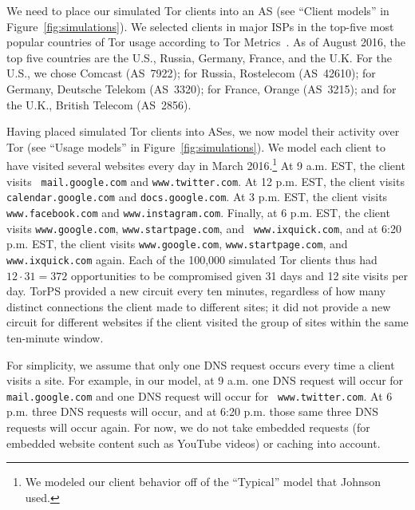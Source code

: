We need to place our simulated Tor clients into an AS (see ``Client models'' in
Figure~\ref{fig:simulations}).  We selected clients in major ISPs in the
top-five most popular countries of Tor usage according to Tor
Metrics~\cite{metrics-countries}.  As of August 2016, the top five countries are
the U.S., Russia, Germany, France, and the U.K.  For the U.S., we chose Comcast
(AS~7922); for Russia, Rostelecom (AS~42610); for Germany, Deutsche Telekom
(AS~3320); for France, Orange (AS~3215); and for the U.K., British Telecom
(AS~2856).

Having placed simulated Tor clients into ASes, we now model their activity over
Tor (see ``Usage models'' in Figure~\ref{fig:simulations}).  We model each
client to have visited several websites every day in March 2016.\footnote{We
modeled our client behavior off of the ``Typical'' model that Johnson
\ea~\cite[\S~5.1.2]{Johnson2013a} used.}  At 9 a.m. EST, the client visits {\tt
mail.google.com} and {\tt www.twitter.com}.  At 12 p.m. EST, the client visits
{\tt calendar.google.com} and {\tt docs.google.com}. At 3 p.m. EST, the client
visits {\tt www.facebook.com} and {\tt www.instagram.com}.  Finally, at 6 p.m.
EST, the client visits {\tt www.google.com}, {\tt www.startpage.com}, and {\tt
www.ixquick.com}, and at 6:20 p.m. EST, the client visits {\tt www.google.com},
{\tt www.startpage.com}, and {\tt www.ixquick.com} again. Each of the 100,000
simulated Tor clients thus had $12 \cdot 31 = 372$ opportunities to be
compromised given 31 days and 12 site visits per day.  TorPS provided a new
circuit every ten minutes, regardless of how many distinct connections the
client made to different sites; it did not provide a new circuit for different
websites if the client visited the group of sites within the same ten-minute
window.

For simplicity, we assume that only one DNS request occurs every time a client
visits a site. For example, in our model, at 9 a.m. one DNS request will occur
for {\tt mail.google.com} and one DNS request will occur for {\tt
www.twitter.com}. At 6 p.m. three DNS requests will occur, and at 6:20 p.m.
those same three DNS requests will occur again.   For now, we do not take
embedded requests (\ie for embedded website content such as YouTube videos) or
caching into account.

